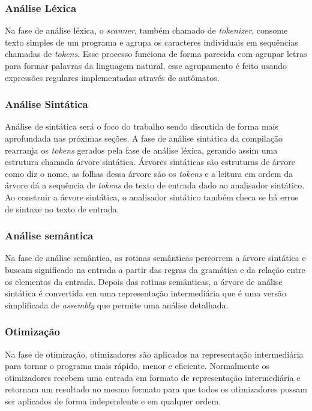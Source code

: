 \subsubsection{Análise Léxica}
Na fase de análise léxica, o \textit{scanner}, também chamado de \textit{tokenizer}, consome texto simples de um programa e agrupa os caracteres individuais em sequências chamadas de \textit{tokens}. Esse processo funciona de forma parecida com agrupar letras para formar palavras da linguagem natural, esse agrupamento é feito usando expressões regulares implementadas através de autômatos.

\subsubsection{Análise Sintática}
Análise de sintática será o foco do trabalho sendo discutida de forma mais aprofundada nas próximas seções. A fase de análise sintática da compilação rearranja os \textit{tokens} gerados pela fase de análise léxica, gerando assim uma estrutura chamada árvore sintática. Árvores sintáticas são estruturas de árvore como diz o nome, as folhas dessa árvore são os \textit{tokens} e a leitura em ordem da árvore dá a sequência de \textit{tokens} do texto de entrada dado ao analisador sintático. Ao construir a árvore sintática, o analisador sintático também checa se há erros de sintaxe no texto de entrada.

\subsubsection{Análise semântica}
Na fase de análise semântica, as rotinas semânticas percorrem a árvore sintática e buscam significado na entrada a partir das regras da gramática e da relação entre os elementos da entrada. Depois das rotinas semânticas, a árvore de análise sintática é convertida em uma representação intermediária que é uma versão simplificada de \textit{assembly} que permite uma análise detalhada.

\subsubsection{Otimização}
Na fase de otimização, otimizadores são aplicados na representação intermediária para tornar o programa mais rápido, menor e eficiente. Normalmente os otimizadores recebem uma entrada em formato de representação intermediária e retornam um resultado no mesmo formato para que todos os otimizadores possam ser aplicados de forma independente e em qualquer ordem.

